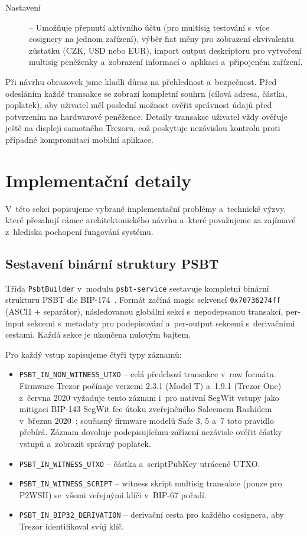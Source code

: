 \begin{description}
\item[Nastavení] -- Umožňuje přepnutí aktivního účtu (pro multisig testování
  s~více cosignery na jednom zařízení), výběr fiat měny pro zobrazení
  ekvivalentu zůstatku (CZK, USD nebo EUR), import output deskriptoru pro
  vytvoření multisig peněženky a~zobrazení informací o~aplikaci
  a~připojeném zařízení.
\end{description}

Při návrhu obrazovek jsme kladli důraz na přehlednost a~bezpečnost.
Před odesláním každé transakce se zobrazí kompletní souhrn (cílová adresa,
částka, poplatek), aby uživatel měl poslední možnost ověřit správnost
údajů před potvrzením na hardwarové peněžence. Detaily transakce
uživatel vždy ověřuje ještě na displeji samotného Trezoru, což poskytuje
nezávislou kontrolu proti případné kompromitaci mobilní aplikace.

\section{Implementační detaily}
\label{sec:impl-detaily}

V~této sekci popisujeme vybrané implementační problémy a~technické výzvy,
které přesahují rámec architektonického návrhu a~které považujeme
za zajímavé z~hlediska pochopení fungování systému.

\subsection{Sestavení binární struktury PSBT}

Třída \texttt{PsbtBuilder} v~modulu \texttt{psbt-service} sestavuje kompletní
binární strukturu PSBT dle BIP-174~\cite{BIP174}. Formát začíná magic sekvencí
\texttt{0x70736274ff} (ASCII  + separátor), následovanou globální sekcí
s~nepodepsanou transakcí, per-input sekcemi s~metadaty pro podepisování
a~per-output sekcemi s~derivačními cestami. Každá sekce je ukončena nulovým bajtem.

Pro každý vstup zapisujeme čtyři typy záznamů:
\begin{itemize}
\item \texttt{PSBT\_IN\_NON\_WITNESS\_UTXO} -- celá předchozí transakce v~raw
  formátu. Firmware Trezor počínaje verzemi 2.3.1 (Model T) a~1.9.1
  (Trezor One) z~června 2020 vyžaduje tento záznam i~pro nativní
  SegWit vstupy jako mitigaci BIP-143 SegWit fee útoku
  zveřejněného Saleemem Rashidem v~březnu
  2020~\cite{TrezorSegwitFix2020}; současný firmware modelů Safe 3,
  5 a~7 toto pravidlo přebírá. Záznam dovoluje podepisujícímu zařízení
  nezávisle ověřit částky vstupů a~zobrazit správný poplatek.
\item \texttt{PSBT\_IN\_WITNESS\_UTXO} -- částka a~scriptPubKey utrácené UTXO.
\item \texttt{PSBT\_IN\_WITNESS\_SCRIPT} -- witness skript multisig transakce
  (pouze pro P2WSH) se~všemi veřejnými klíči v~BIP-67 pořadí.
\item \texttt{PSBT\_IN\_BIP32\_DERIVATION} -- derivační cesta pro každého
  cosignera, aby Trezor identifikoval svůj klíč.
\end{itemize}

